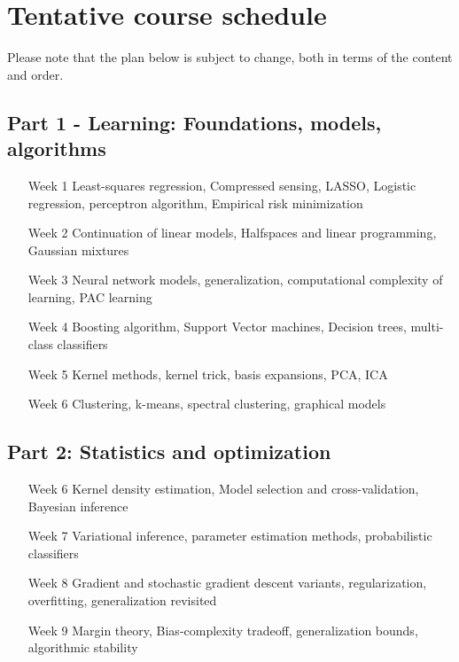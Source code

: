 \documentclass[12pt]{article}
\begin{document}
\section{Tentative course schedule}
Please note that the plan below is subject to change, both in terms of the content and order.
\subsection*{Part 1 - Learning: Foundations, models, algorithms}
\begin{itemize}
	\item[Week 1] Least-squares regression, Compressed sensing, LASSO, Logistic regression, perceptron algorithm, Empirical risk minimization
	\item[Week 2] Continuation of linear models, Halfspaces and linear programming, Gaussian mixtures
	\item[Week 3 ] Neural network models, generalization, computational complexity of learning, PAC learning
	\item[Week 4] Boosting algorithm, Support Vector machines, Decision trees, multi-class classifiers
	\item[Week 5] Kernel methods, kernel trick, basis expansions, PCA, ICA
	\item[Week 6] Clustering, k-means, spectral clustering, graphical models
\end{itemize}
\subsection*{Part 2: Statistics and optimization}
\begin{itemize}
	\item[Week 6] Kernel density estimation, Model selection and cross-validation, Bayesian inference
	\item[Week 7] Variational inference, parameter estimation methods, probabilistic classifiers
	\item[Week 8] Gradient and stochastic gradient descent variants, regularization, overfitting, generalization revisited

	\item[Week 9] Margin theory, Bias-complexity tradeoff, generalization bounds, algorithmic stability

	\end{itemize}
\end{document}
